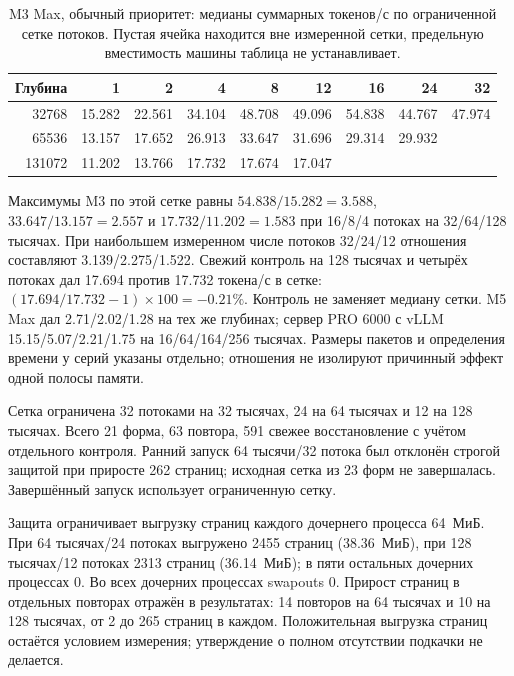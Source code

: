 \begin{table}[t]
\centering
\caption{M3 Max, обычный приоритет: медианы суммарных токенов/с по ограниченной сетке потоков.
Пустая ячейка находится вне измеренной сетки, предельную вместимость машины таблица не устанавливает.}
\label{tab:m3-capped-decode}
\footnotesize
\begin{tabular}{rrrrrrrrr}
\toprule
Глубина & 1 & 2 & 4 & 8 & 12 & 16 & 24 & 32 \\
\midrule
32768 & 15.282 & 22.561 & 34.104 & 48.708 & 49.096 & 54.838 & 44.767 & 47.974 \\
65536 & 13.157 & 17.652 & 26.913 & 33.647 & 31.696 & 29.314 & 29.932 & \\
131072 & 11.202 & 13.766 & 17.732 & 17.674 & 17.047 & & & \\
\bottomrule
\end{tabular}
\end{table}

Максимумы M3 по этой сетке равны $54.838/15.282=3.588$, $33.647/13.157=2.557$
и $17.732/11.202=1.583$ при 16/8/4 потоках на 32/64/128 тысячах.
При наибольшем измеренном числе потоков 32/24/12 отношения составляют 3.139/2.275/1.522.
Свежий контроль на 128 тысячах и четырёх потоках дал 17.694 против 17.732 токена/с в сетке:
$(17.694/17.732-1)\times100=-0.21\%$. Контроль не заменяет медиану сетки.
M5 Max дал 2.71/2.02/1.28 на тех же глубинах; сервер PRO 6000 с vLLM 15.15/5.07/2.21/1.75
на 16/64/164/256 тысячах. Размеры пакетов и определения времени у серий указаны отдельно;
отношения не изолируют причинный эффект одной полосы памяти.

Сетка ограничена 32 потоками на 32 тысячах, 24 на 64 тысячах и 12 на 128 тысячах.
Всего 21 форма, 63 повтора, 591 свежее восстановление с учётом отдельного контроля.
Ранний запуск 64 тысячи/32 потока был отклонён строгой защитой при приросте 262 страниц;
исходная сетка из 23 форм не завершалась. Завершённый запуск использует ограниченную сетку.

Защита ограничивает выгрузку страниц каждого дочернего процесса 64~МиБ.
При 64 тысячах/24 потоках выгружено 2455 страниц (38.36~МиБ),
при 128 тысячах/12 потоках 2313 страниц (36.14~МиБ); в пяти остальных дочерних процессах 0.
Во всех дочерних процессах swapouts 0. Прирост страниц в отдельных повторах отражён в результатах:
14 повторов на 64 тысячах и 10 на 128 тысячах, от 2 до 265 страниц в каждом.
Положительная выгрузка страниц остаётся условием измерения; утверждение о полном отсутствии подкачки не делается.

